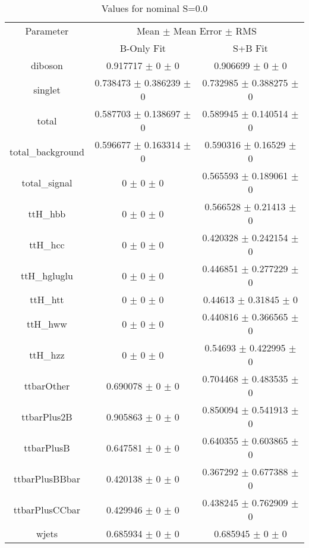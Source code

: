 \begin{table}
\centering
\caption{Values for nominal S=0.0}
\begin{tabular}{ccc}
\toprule
Parameter & \multicolumn{2}{c}{Mean $\pm$ Mean Error $\pm$ RMS}\\
 & B-Only Fit & S+B Fit\\
\midrule
diboson & \num{0.917717} $\pm$ \num{0} $\pm$ \num{0} & \num{0.906699} $\pm$ \num{0} $\pm$ \num{0}\\
singlet & \num{0.738473} $\pm$ \num{0.386239} $\pm$ \num{0} & \num{0.732985} $\pm$ \num{0.388275} $\pm$ \num{0}\\
total & \num{0.587703} $\pm$ \num{0.138697} $\pm$ \num{0} & \num{0.589945} $\pm$ \num{0.140514} $\pm$ \num{0}\\
total\_background & \num{0.596677} $\pm$ \num{0.163314} $\pm$ \num{0} & \num{0.590316} $\pm$ \num{0.16529} $\pm$ \num{0}\\
total\_signal & \num{0} $\pm$ \num{0} $\pm$ \num{0} & \num{0.565593} $\pm$ \num{0.189061} $\pm$ \num{0}\\
ttH\_hbb & \num{0} $\pm$ \num{0} $\pm$ \num{0} & \num{0.566528} $\pm$ \num{0.21413} $\pm$ \num{0}\\
ttH\_hcc & \num{0} $\pm$ \num{0} $\pm$ \num{0} & \num{0.420328} $\pm$ \num{0.242154} $\pm$ \num{0}\\
ttH\_hgluglu & \num{0} $\pm$ \num{0} $\pm$ \num{0} & \num{0.446851} $\pm$ \num{0.277229} $\pm$ \num{0}\\
ttH\_htt & \num{0} $\pm$ \num{0} $\pm$ \num{0} & \num{0.44613} $\pm$ \num{0.31845} $\pm$ \num{0}\\
ttH\_hww & \num{0} $\pm$ \num{0} $\pm$ \num{0} & \num{0.440816} $\pm$ \num{0.366565} $\pm$ \num{0}\\
ttH\_hzz & \num{0} $\pm$ \num{0} $\pm$ \num{0} & \num{0.54693} $\pm$ \num{0.422995} $\pm$ \num{0}\\
ttbarOther & \num{0.690078} $\pm$ \num{0} $\pm$ \num{0} & \num{0.704468} $\pm$ \num{0.483535} $\pm$ \num{0}\\
ttbarPlus2B & \num{0.905863} $\pm$ \num{0} $\pm$ \num{0} & \num{0.850094} $\pm$ \num{0.541913} $\pm$ \num{0}\\
ttbarPlusB & \num{0.647581} $\pm$ \num{0} $\pm$ \num{0} & \num{0.640355} $\pm$ \num{0.603865} $\pm$ \num{0}\\
ttbarPlusBBbar & \num{0.420138} $\pm$ \num{0} $\pm$ \num{0} & \num{0.367292} $\pm$ \num{0.677388} $\pm$ \num{0}\\
ttbarPlusCCbar & \num{0.429946} $\pm$ \num{0} $\pm$ \num{0} & \num{0.438245} $\pm$ \num{0.762909} $\pm$ \num{0}\\
wjets & \num{0.685934} $\pm$ \num{0} $\pm$ \num{0} & \num{0.685945} $\pm$ \num{0} $\pm$ \num{0}\\
\bottomrule
\end{tabular}
\end{table}